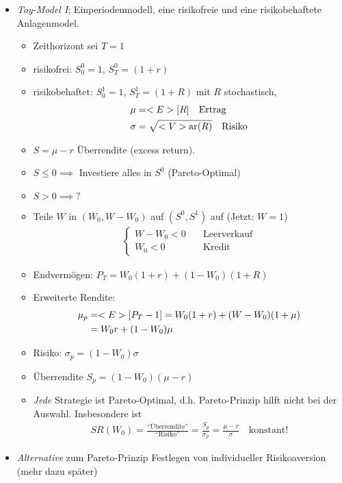 \begin{itemize} %
	\item \emph{Toy-Model I}; Einperiodenmodell, eine risikofreie und eine risikobehaftete Anlagenmodel.
	\begin{itemize}
		\item Zeithorizont sei $T=1$
		\item risikofrei: $S_0^0 = 1$, $S_T^0 = (1+r)$
		\item risikobehaftet: $S_0^1 = 1$, $S_T^1 = (1+R)$ mit $R$ stochastisch,
		\begin{align*}
			\mu &= <E>[R] \quad \text{Ertrag}\\
			\sigma &= \sqrt{<V>\text{ar}(R)} \quad \text{Risiko}
		\end{align*}
		\item $S=\mu -r$ Überrendite (excess return).
		\item $S \le 0 \implies$ Investiere alles in $S^0$ (Pareto-Optimal)
		\item $S > 0 \implies ?$
		\item Teile $W$ in $(W_0, W-W_0)$ auf $(S^0,S^1)$ auf (Jetzt: $W=1$)
		\begin{align*}
			\begin{cases}
				W-W_0 < 0 &\quad \text{Leerverkauf}\\
				W_0 < 0 &\quad \text{Kredit}
			\end{cases}
		\end{align*}
		\item Endvermögen: $P_T = W_0(1+r) + (1-W_0)(1+R)$
		\item Erweiterte Rendite: 
		\begin{align*}
			\mu_p &= <E>[P_T-1] = W_0(1+r)+(W-W_0)(1+\mu)\\
			&= W_0 r + (1-W_0)\mu\\
		\end{align*}
		\item Risiko: $\sigma_p = (1-W_0)\sigma$
		\item Überrendite $S_p = (1-W_0)(\mu -r)$
		\item \emph{Jede} Strategie ist Pareto-Optimal, d.h. Pareto-Prinzip  hilft nicht bei der Auswahl. Insbesondere ist  
		\begin{align*}
			SR(W_0) = \frac{\text{``Überrendite''}}{\text{``Risiko''}} = \frac{S_p}{\sigma_p} = \frac{\mu -r}{\sigma} \quad \text{konstant!}
		\end{align*}
	\end{itemize}
	\item \emph{Alternative} zum Pareto-Prinzip Festlegen von individueller Risikoaversion (mehr dazu später)

\end{itemize}
